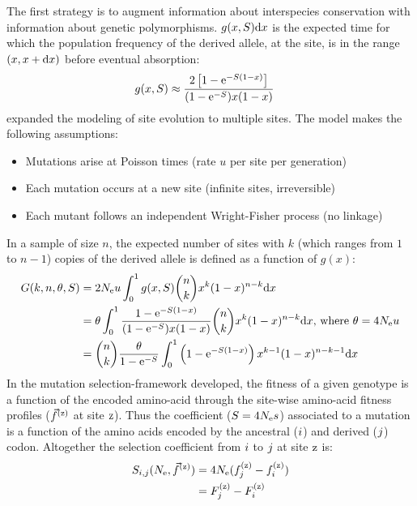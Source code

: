 The first strategy is to augment information about interspecies conservation with information about genetic polymorphisms.
$g(x, S) \mathrm{d} x $ is the expected time for which the population frequency of the derived allele, at the site, is in the range $(x, x+\mathrm{d} x)$ before eventual absorption:
\begin{align}
	g(x, S) & \approx \dfrac{2 \left[ 1 - \text{e}^{-S (1-x)}\right]}{(1 - \text{e}^{-S})x(1-x)}
\end{align}
\citet{Sawyer1992} expanded the modeling of site evolution to multiple sites.
The model makes the following assumptions:
\begin{itemize}
	\setlength\itemsep{-0.2em}
	\item Mutations arise at Poisson times (rate $u$ per site per generation)
	\item Each mutation occurs at a new site (infinite sites, irreversible)
	\item Each mutant follows an independent Wright-Fisher process (no linkage)
\end{itemize}
In a sample of size $n$, the expected number of sites with $k$ (which ranges from $1$ to $n-1$) copies of the derived allele is defined as a function of $g(x)$:
\begin{align}
	G(k, n, \theta, S) & = 2 N_{\text{e}} u \int_{0}^{1} g(x, S) \binom{n}{k} x^{k} (1-x)^{n-k} \mathrm{d} x \nonumber \\
	& = \theta \int_{0}^{1} \dfrac{1 - \text{e}^{-S (1-x)}}{(1 - \text{e}^{-S})x(1-x)} \binom{n}{k} x^{k} (1-x)^{n-k} \mathrm{d} x\text{, where } \theta=4N_{\text{e}} u \nonumber \\
	& = \binom{n}{k} \dfrac{\theta }{1 - \text{e}^{-S}} \int_{0}^{1} \left( 1 - \text{e}^{-S (1-x)} \right) x^{k-1} (1-x)^{n-k-1} \mathrm{d} x
\end{align}
In the mutation selection-framework developed, the fitness of a given genotype is a function of the encoded amino-acid through the site-wise amino-acid fitness profiles ($ \vec{f}^{(\text{z})} $ at site $\text{z}$).
Thus the coefficient ($S=4N_{\text{e}} s$) associated to a mutation is a function of the amino acids encoded by the ancestral (${i}$) and derived (${j}$) codon.
Altogether the selection coefficient from ${i}$ to ${j}$ at site $\text{z}$ is:
\begin{align}
	S_{{i}, {j}}(N_{\text{e}}, \vec{f}^{(\text{z})}) &= 4 N_{\text{e}} (f_{j}^{(\text{z})}-f_{i}^{(\text{z})}) \nonumber \\
	& = F_{j}^{(\text{z})}-F_{i}^{(\text{z})}
\end{align}
